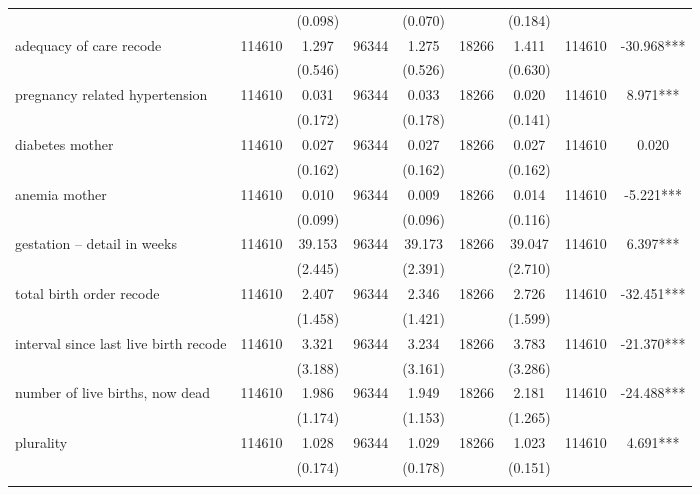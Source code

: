 \begin{tabular}{@{\extracolsep{5pt}}lcccccccc}
 &   & (0.098)  &   & (0.070)  &   & (0.184)  &   &  \\ [1ex]
adequacy of care recode   & 114610    & 1.297    & 96344    & 1.275    & 18266    & 1.411    & 114610    & -30.968***   \\
 &   & (0.546)  &   & (0.526)  &   & (0.630)  &   &  \\ [1ex]
pregnancy related hypertension   & 114610    & 0.031    & 96344    & 0.033    & 18266    & 0.020    & 114610    & 8.971***   \\
 &   & (0.172)  &   & (0.178)  &   & (0.141)  &   &  \\ [1ex]
diabetes mother   & 114610    & 0.027    & 96344    & 0.027    & 18266    & 0.027    & 114610    & 0.020   \\
 &   & (0.162)  &   & (0.162)  &   & (0.162)  &   &  \\ [1ex]
anemia mother   & 114610    & 0.010    & 96344    & 0.009    & 18266    & 0.014    & 114610    & -5.221***   \\
 &   & (0.099)  &   & (0.096)  &   & (0.116)  &   &  \\ [1ex]
gestation -- detail in weeks   & 114610    & 39.153    & 96344    & 39.173    & 18266    & 39.047    & 114610    & 6.397***   \\
 &   & (2.445)  &   & (2.391)  &   & (2.710)  &   &  \\ [1ex]
total birth order recode   & 114610    & 2.407    & 96344    & 2.346    & 18266    & 2.726    & 114610    & -32.451***   \\
 &   & (1.458)  &   & (1.421)  &   & (1.599)  &   &  \\ [1ex]
interval since last live birth recode   & 114610    & 3.321    & 96344    & 3.234    & 18266    & 3.783    & 114610    & -21.370***   \\
 &   & (3.188)  &   & (3.161)  &   & (3.286)  &   &  \\ [1ex]
number of live births, now dead   & 114610    & 1.986    & 96344    & 1.949    & 18266    & 2.181    & 114610    & -24.488***   \\
 &   & (1.174)  &   & (1.153)  &   & (1.265)  &   &  \\ [1ex]
plurality   & 114610    & 1.028    & 96344    & 1.029    & 18266    & 1.023    & 114610    & 4.691***   \\
 &   & (0.174)  &   & (0.178)  &   & (0.151)  &   &  \\ [1ex]
\hline \hline \\[-1.8ex]

\end{tabular}
